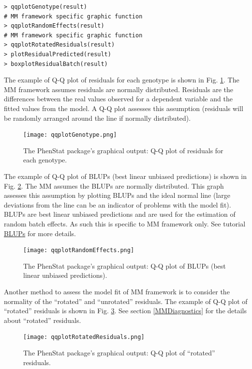 \documentclass[12pt,a4paper]{article}
\begin{document}
\begingroup
\fontsize{8pt}{12pt}\selectfont
\begin{verbatim}
> qqplotGenotype(result)
# MM framework specific graphic function 
> qqplotRandomEffects(result)
# MM framework specific graphic function 
> qqplotRotatedResiduals(result)
> plotResidualPredicted(result)
> boxplotResidualBatch(result)
\end{verbatim}
\endgroup 

The example of Q-Q plot of residuals for each genotype is shown in Fig. \ref{fig:10}. The MM framework assumes residuals are normally distributed. Residuals are the differences between the real values observed for a dependent variable and the fitted values from the model. A Q-Q plot assesses this assumption (residuals will be randomly arranged around the line if normally distributed). 
\begin{figure}[!tpb]%
\centerline{\texttt{[image: qqplotGenotype.png]}}
\caption{The PhenStat package's graphical output: Q-Q plot of residuals for each genotype.}\label{fig:10}
\end{figure}


The example of Q-Q plot of BLUPs (best linear unbiased predictions) is shown in Fig. \ref{fig:11}. The MM assumes the BLUPs are normally distributed. This graph assesses this assumption by plotting BLUPs and the ideal normal line (large deviations from the line can be an indicator of problems with the model fit). BLUPs are best linear unbiased predictions and are used for the estimation of random batch effects. As such this is specific to MM framework only. See tutorial \href{http://www.extension.org/pages/61006/the-solcap-tomato-phenotypic-data:-estimating-heritability-and-blups-for-traits#.Ui4zjWRgYXc}{BLUPs} for more details.

\begin{figure}[!htpb]%
\centerline{\texttt{[image: qqplotRandomEffects.png]}}
\caption{The PhenStat package's graphical output: Q-Q plot of BLUPs (best linear unbiased predictions).}\label{fig:11}
\end{figure}

Another method to assess the model fit of MM framework is to consider the normality of the ``rotated'' and ``unrotated'' residuals. The example of Q-Q plot of ``rotated'' residuals is shown in Fig. \ref{fig:12}. 
See section \ref{MMDiagnostics} for the details about ``rotated'' residuals.

\begin{figure}[!htpb]%
\centerline{\texttt{[image: qqplotRotatedResiduals.png]}}
\caption{The PhenStat package's graphical output: Q-Q plot of ``rotated'' residuals.}\label{fig:12}
\end{figure}
\end{document}
